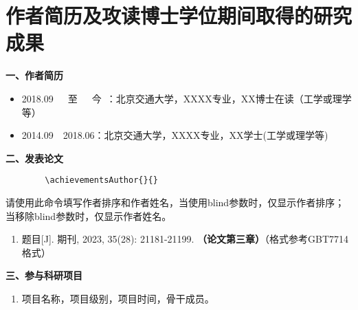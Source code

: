 \chapter*{作者简历及攻读博士学位期间取得的研究成果}

{\setlength{\baselineskip}{16bp}

	\textbf{一、作者简历}

	\begin{itemize}
		\item 2018.09~\cndash~~至~~~今~：北京交通大学，XXXX专业，XX博士在读（工学或理学等）

		\item 2014.09~\cndash~2018.06：北京交通大学，XXXX专业，XX学士(工学或理学等)

	\end{itemize}

	\textbf{二、发表论文}
	\setlength\leftmargini{3.5em}
	\renewcommand{\labelenumi}{[\theenumi]}

	\begin{verbatim}
		\achievementsAuthor{}{}
	\end{verbatim}
	请使用此命令填写作者排序和作者姓名，当使用blind参数时，仅显示作者排序；当移除blind参数时，仅显示作者姓名。

	\begin{enumerate}

		\item {} 题目[J]. 期刊, 2023, 35(28): 21181-21199. \textbf{（论文第三章）}（格式参考GBT7714格式）

	\end{enumerate}

	\textbf{三、参与科研项目}
	\begin{enumerate}
		\item 项目名称，项目级别，项目时间，骨干成员。
	\end{enumerate}

}
